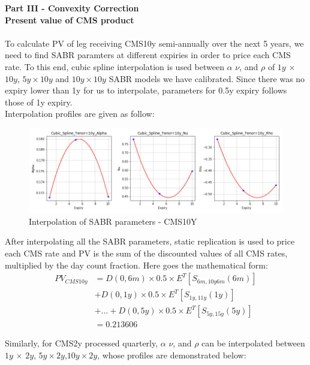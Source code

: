 \documentclass{article}
\begin{document}
	
\par \noindent \textbf{Part III - Convexity Correction}\\


\noindent \textbf{Present value of CMS product}	\\ \\                     
\noindent To calculate PV of leg receiving CMS10y semi-annually over the next 5 years, we need to find SABR paramters at different expiries in order to price each CMS rate. To this end, cubic spline interpolation is used between $\alpha$ $\nu$, and $\rho$ of $1y$ $\times$ $10y$, $5y\times10y$ and $10y\times10y$ SABR models we have calibrated. Since there was no expiry lower than 1y for us to interpolate, parameters for 0.5y expiry follows those of 1y expiry.\\

\noindent Interpolation profiles are given as follow:

\begin{figure}[h]
	\centering
	\includegraphics[scale=0.5]{Cubic_10y.png}
	\caption{Interpolation of SABR parameters - CMS10Y}
\end{figure}	

\noindent After interpolating all the SABR parameters, static replication is used to price each CMS rate and PV is the sum of the discounted values of all CMS rates, multiplied by the day count fraction. Here goes the mathematical form:
\begin{align*}
PV_{CMS10y}&=D(0,6m)\times 0.5 \times E^T [S_{6m,10y6m}(6m)] \\&+ D(0,1y) \times 0.5 \times E^T [S_{1y,11y}(1y)]\\&+ \dots 
+D(0,5y) \times 0.5 \times E^T [S_{5y,15y}(5y)]\\&= 0.213606
\end{align*}



\noindent Similarly, for CMS2y processed quarterly, $\alpha$ $\nu$, and $\rho$ can be interpolated between $1y$ $\times$ $2y$, $5y\times2y$,$10y\times2y$, whose profiles are demonstrated below:
\end{document}
